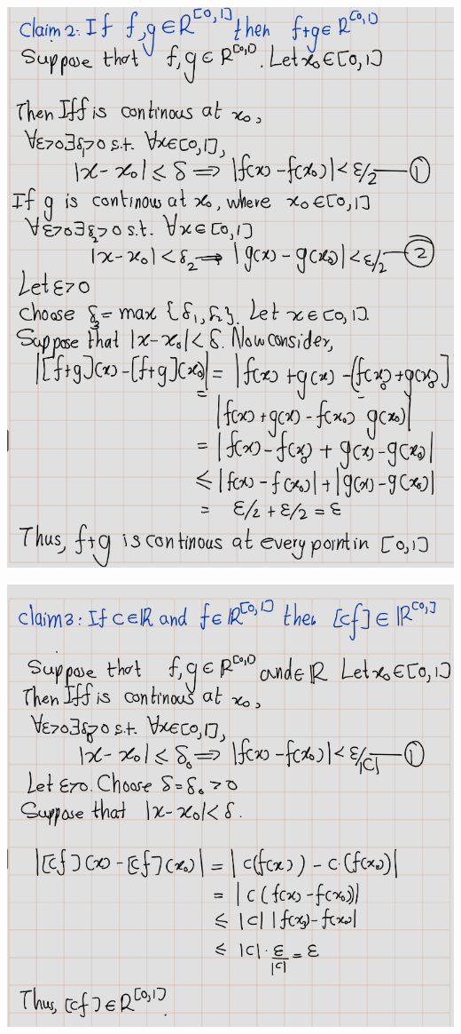 \documentclass[
]{book}
\theoremstyle{definition}
\theoremstyle{definition}
\theoremstyle{definition}
\theoremstyle{definition}
\theoremstyle{remark}
\begin{document}
\includegraphics[width=9.39in]{fig/Ex1C/Ex2-3}

\includegraphics[width=9.68in]{fig/Ex1C/Ex2-4}
\end{document}
